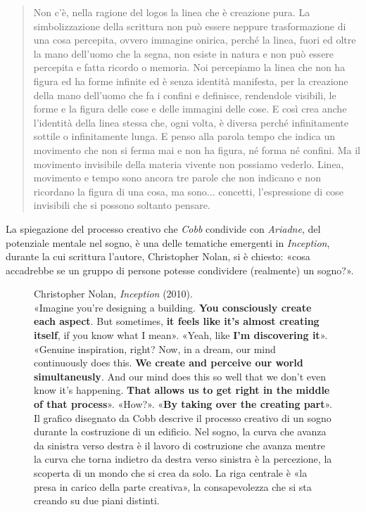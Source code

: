 \documentclass{../../lib/gs}
\begin{document}
\begin{quote}
  Non c’è, nella ragione del logos la linea che è creazione pura. La
  simbolizzazione della scrittura non può essere neppure trasformazione di una
  cosa percepita, ovvero immagine onirica, perché la linea, fuori ed oltre la
  mano dell’uomo che la segna, non esiste in natura e non può essere percepita
  e fatta ricordo o memoria. Noi percepiamo la linea che non ha figura ed ha
  forme infinite ed è senza identità manifesta, per la creazione della mano
  dell’uomo che fa i confini e definisce, rendendole visibili, le forme e la
  figura delle cose e delle immagini delle cose. E così crea anche l’identità
  della linea stessa che, ogni volta, è diversa perché infinitamente sottile o
  infinitamente lunga. E penso alla parola tempo che indica un movimento che
  non si ferma mai e non ha figura, né forma né confini. Ma il movimento
  invisibile della materia vivente non possiamo vederlo. Linea, movimento e
  tempo sono ancora tre parole che non indicano e non ricordano la figura
  di una cosa, ma sono... concetti, l’espressione di cose invisibili che si
  possono soltanto pensare. \cite{mf:left2008}
\end{quote}

La spiegazione del processo creativo che \emph{Cobb} condivide con
\emph{Ariadne}, del potenziale mentale nel sogno, è una delle tematiche
emergenti in \emph{Inception}, durante la cui scrittura l'autore, Christopher
Nolan, si è chiesto: «cosa accadrebbe se un gruppo di persone potesse
condividere (realmente) un sogno?».

\begin{figure}[ht]
\centering
\caption{Christopher Nolan, \emph{Inception} (2010).\\
         «Imagine you're designing a building. \textbf{You consciously create
         each aspect}. But sometimes,
         \textbf{it feels like it's almost creating itself}, if you know what I
         mean». «Yeah, like \textbf{I'm discovering it}». «Genuine inspiration,
         right? Now, in a dream, our mind continuously does this.
         \textbf{We create and perceive our world simultaneusly}. And our mind
         does this so well that we don't even know it's happening.
         \textbf{That allows us to get right in the middle of that process}».
         «How?». «\textbf{By taking over the creating part}».
         Il grafico disegnato da Cobb descrive il processo creativo di un sogno
         durante la costruzione di un edificio. Nel sogno, la curva che avanza
         da sinistra verso destra è il lavoro di costruzione che avanza mentre
         la curva che torna indietro da destra verso sinistra è la percezione,
         la scoperta di un mondo che si crea da solo. La riga centrale è «la
         presa in carico della parte creativa», la consapevolezza che si sta
         creando su due piani distinti.}
\label{tikz:inception}
\end{figure}
\end{document}
